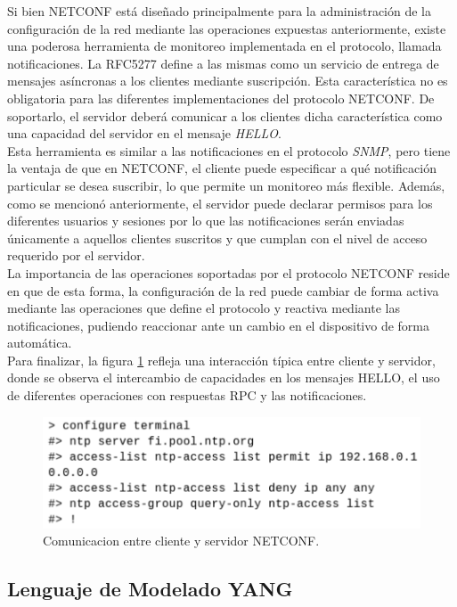   Si bien NETCONF está diseñado principalmente para la administración de la configuración de la red mediante las operaciones expuestas anteriormente, existe una poderosa herramienta de monitoreo implementada en el protocolo, llamada notificaciones. La RFC5277 define a las mismas como un servicio de entrega de mensajes asíncronas a los clientes mediante suscripción. Esta característica no es obligatoria para las diferentes implementaciones del protocolo NETCONF. De soportarlo, el servidor deberá comunicar a los clientes dicha característica como una capacidad del servidor en el mensaje \textit{HELLO}.
  \\

  Esta herramienta es similar a las notificaciones en el protocolo \textit{SNMP}, pero tiene la ventaja de que en NETCONF, el cliente puede especificar a qué notificación particular se desea suscribir, lo que permite un monitoreo más flexible. Además, como se mencionó anteriormente, el servidor puede declarar permisos para los diferentes usuarios y sesiones por lo que las notificaciones serán enviadas únicamente a aquellos clientes suscritos y que cumplan con el nivel de acceso requerido por el servidor.
  \\

  La importancia de las operaciones soportadas por el protocolo NETCONF reside en que de esta forma, la configuración de la red puede cambiar de forma activa mediante las operaciones que define el protocolo y reactiva mediante las notificaciones, pudiendo reaccionar ante un cambio en el dispositivo de forma automática.
  \\

  Para finalizar, la figura \ref{fig:netconf_ejemplo} refleja una interacción típica entre cliente y servidor, donde se observa el intercambio de capacidades en los mensajes HELLO, el uso de diferentes operaciones con respuestas RPC y las notificaciones.

  \begin{figure}[htbp]
	\centering
	\includegraphics[scale=0.6]{Figures/cli.pdf}
	\caption{Comunicacion entre cliente y servidor NETCONF.}
	\label{fig:netconf_ejemplo}
  \end{figure}

  \subsection{Lenguaje de Modelado YANG}